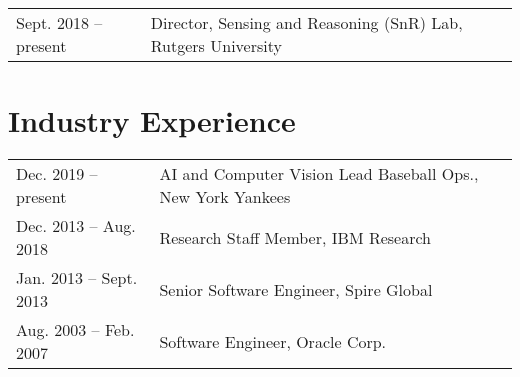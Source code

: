 \documentclass[12pt]{article}
\begin{document}
\begin{tabular}{l l}
Sept. 2018 -- present & Director, Sensing and Reasoning (SnR) Lab, Rutgers University \\
\end{tabular}

\section{Industry Experience}

\begin{tabular}{l l}
Dec. 2019 -- present & AI and Computer Vision Lead Baseball Ops., New York Yankees \\
Dec. 2013 -- Aug. 2018 & Research Staff Member, IBM Research \\
Jan. 2013 -- Sept. 2013 & Senior Software Engineer, Spire Global \\
Aug. 2003 -- Feb. 2007 & Software Engineer, Oracle Corp. \\
\end{tabular}
\end{document}
